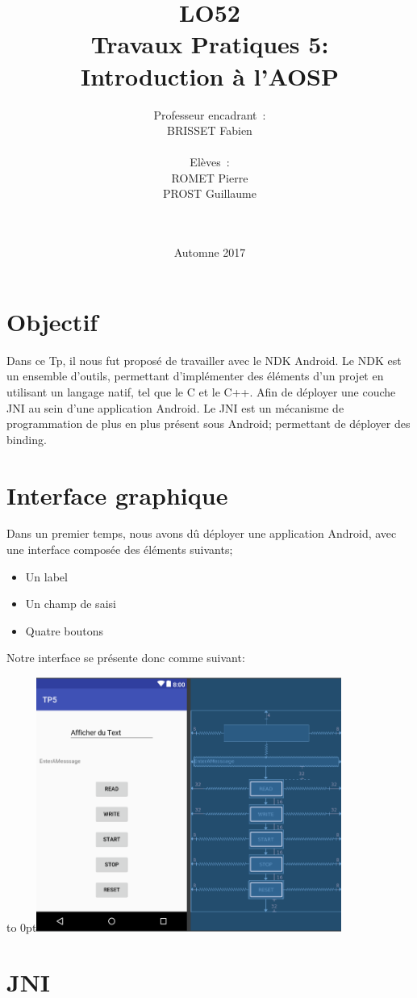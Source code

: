 \documentclass[french,a4paper,12pt]{report}
\title{LO52\\ Travaux Pratiques 5:\\ Introduction à l'AOSP}
\author{Professeur encadrant : \\BRISSET Fabien \\ \\ Elèves : \\ROMET Pierre
\\PROST Guillaume \\ \\ \\}
\date{Automne 2017}
\begin{document}
\maketitle
\tableofcontents

\chapter{Objectif}
Dans ce Tp, il nous fut proposé de travailler avec le NDK Android.
Le NDK est un ensemble d'outils, permettant d'implémenter des éléments d'un
projet en utilisant un langage natif, tel que le C et le C++.
Afin de déployer une couche JNI au sein d'une application Android.
Le JNI est un mécanisme de programmation de plus en plus présent sous Android;
permettant de déployer des binding.

\chapter{Interface graphique}
Dans un premier temps, nous avons dû déployer une application Android, avec une
interface composée des éléments suivants;
\begin{itemize}
  \item Un label
  \item Un champ de saisi
  \item Quatre boutons
\end{itemize}

Notre interface se présente donc comme suivant:

\hfill\hbox to 0pt{\hss\includegraphics[width=10cm]{1.png}\hss}\hfill\null\newline

\chapter{JNI}
\end{document}
